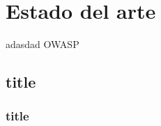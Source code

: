 \chapter{Estado del arte}
\lipsum[1-2]
adasdad \ac{OWASP}

\section{title}
\subsection{title}
\lipsum	